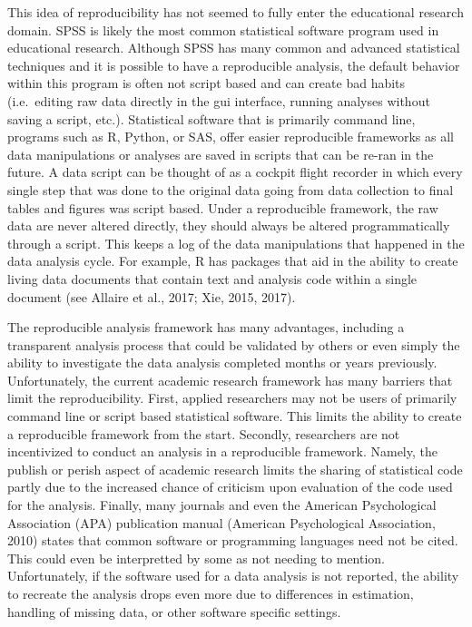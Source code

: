 \documentclass[english,floatsintext,man]{apa6}
\theoremstyle{definition}
\theoremstyle{definition}
\theoremstyle{remark}
\begin{document}
This idea of reproducibility has not seemed to fully enter the
educational research domain. SPSS is likely the most common statistical
software program used in educational research. Although SPSS has many
common and advanced statistical techniques and it is possible to have a
reproducible analysis, the default behavior within this program is often
not script based and can create bad habits (i.e.~editing raw data
directly in the gui interface, running analyses without saving a script,
etc.). Statistical software that is primarily command line, programs
such as R, Python, or SAS, offer easier reproducible frameworks as all
data manipulations or analyses are saved in scripts that can be re-ran
in the future. A data script can be thought of as a cockpit flight
recorder in which every single step that was done to the original data
going from data collection to final tables and figures was script based.
Under a reproducible framework, the raw data are never altered directly,
they should always be altered programmatically through a script. This
keeps a log of the data manipulations that happened in the data analysis
cycle. For example, R has packages that aid in the ability to create
living data documents that contain text and analysis code within a
single document (see Allaire et al., 2017; Xie, 2015, 2017).

The reproducible analysis framework has many advantages, including a
transparent analysis process that could be validated by others or even
simply the ability to investigate the data analysis completed months or
years previously. Unfortunately, the current academic research framework
has many barriers that limit the reproducibility. First, applied
researchers may not be users of primarily command line or script based
statistical software. This limits the ability to create a reproducible
framework from the start. Secondly, researchers are not incentivized to
conduct an analysis in a reproducible framework. Namely, the publish or
perish aspect of academic research limits the sharing of statistical
code partly due to the increased chance of criticism upon evaluation of
the code used for the analysis. Finally, many journals and even the
American Psychological Association (APA) publication manual (American
Psychological Association, 2010) states that common software or
programming languages need not be cited. This could even be interpretted
by some as not needing to mention. Unfortunately, if the software used
for a data analysis is not reported, the ability to recreate the
analysis drops even more due to differences in estimation, handling of
missing data, or other software specific settings.
\end{document}
